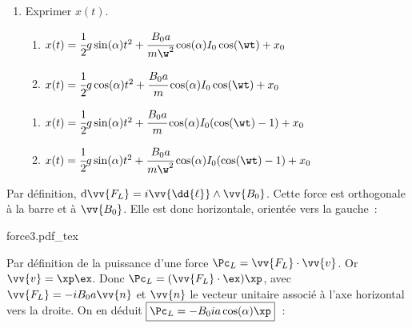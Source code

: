 \documentclass[11pt]{book}
\newcommand{\figsvg}[1]{
  \begin{center}
    {#1}
  \end{center}
}
\begin{document}
{\begin{enumerate}
\begin{minipage}{0.5\linewidth}
\begin{enumerate}
			      \end{enumerate}
		      \end{minipage}
		      \begin{minipage}{0.5\linewidth}
			      \begin{enumerate}[start=3]
				      \item $m\xpp=mg\cos(\alpha)-B_0ia$
				      \item $m\xpp=mg\sin(\alpha)-B_0ia$
			      \end{enumerate}
		      \end{minipage}
		\item Exprimer $x(t)$.
		      \smallbreak
		      \noindent
		      \begin{minipage}{0.5\linewidth}
			      \begin{enumerate}
				      \item $x(t)=\cfrac{1}{2}g\sin(\alpha)t^2+
					            \cfrac{B_0a}{m\w^2}\cos(\alpha) I_0\cos(\wt)+x_0$
				      \item $x(t)=\cfrac{1}{2}g\cos(\alpha)t^2+
					            \cfrac{B_0a}{m}\cos(\alpha) I_0\cos(\wt)+x_0$
			      \end{enumerate}
		      \end{minipage}
		      \begin{minipage}{0.5\linewidth}
			      \begin{enumerate}[start=3]
				      \item $x(t)=\cfrac{1}{2}g\sin(\alpha)t^2+
					            \cfrac{B_0a}{m}\cos(\alpha) I_0(\cos(\wt)-1)+x_0$
				      \item $x(t)=\cfrac{1}{2}g\sin(\alpha)t^2+
					            \cfrac{B_0a}{m\w^2}\cos(\alpha) I_0(\cos(\wt)-1)+x_0$
			      \end{enumerate}
		      \end{minipage}
	\end{enumerate}
}{
	\begin{enumerate}
		 Par définition, ${\rm d}\vv{F_L}=i\vv{\dd{\ell}}\wedge \vv{B_0}$.
		Cette force est orthogonale à la barre et à $\vv{B_0}$. Elle est donc
		horizontale, orientée vers la gauche~: 
		\figsvg{force3.pdf_tex}
		 Par définition de la puissance d'une force $\Pc_L=\vv{F_L}\cdot\vv{v}$.
		Or $\vv{v}=\xp\ex$.
		\smallbreak
		Donc $\Pc_L=(\vv{F_L}\cdot\ex)\xp$, avec $\vv{F_L}=-iB_0a\vv{n}$ et
		$\vv{n}$ le vecteur unitaire associé à l'axe horizontal vers la droite.
		\smallbreak
		On en déduit $\boxed{\Pc_L=-B_0ia\cos(\alpha)\xp}$~: 

\end{enumerate}}
\end{document}
